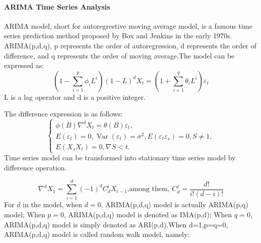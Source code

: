 \documentclass[../mcmpaper]{subfiles}
\begin{document}
    \paragraph{ARIMA Time Series Analysis}
    ARIMA model, short for autoregrestive moving average model, is a famous time series prediction method proposed by Box and Jenkins in the early 1970s\cite{7}. ARIMA(p,d,q), p represents the order of autoregression, d represents the order of difference, and q represents the order of moving average.The model can be expressed as:
    \begin{equation}
    \left(1-\sum_{i=1}^{p} \phi_{i} L^{i}\right)(1-L)^{d} X_{t}=\left(1+\sum_{i=1}^{q} \theta_{i} L^{i}\right) \varepsilon_{t}
    \end{equation}
    L is a lag operator and d is a positive integer.
    \par
    The difference expression is as follows:
    \begin{equation}
    \left\{\begin{array}{l}
    \phi(B) \nabla^{d} X_{t}=\theta(B) \varepsilon_{t}, \\
    E\left(\varepsilon_{t}\right)=0, \operatorname{Var}\left(\varepsilon_{t}\right)=\sigma^{2}, E\left(\varepsilon_{t} \varepsilon_{s}\right)=0, S \neq 1, \\
    E\left(X_{s} X_{t}\right)=0, \nabla S<t .
    \end{array}\right.
    \end{equation}
    Time series model can be transformed into stationary time series model by difference operation.
    \par
    \begin{equation}
    \nabla^{d}X_1=\sum_{i=1}^{d}(-1)^{d} C_{d}^{i} X_{t-1} \text {,among them, } C_{d}^{j}=\frac{d !}{i !(d-i) !}
    \end{equation}
    For $d$ in the model, when $d=0$, ARIMA(p,d,q) model is actually ARIMA(p,q) model; When $p=0$, ARIMA(p,d,q) model is denoted as IMA(p,d); When $q=0$, ARIMA(p,d,q) model is simply denoted as ARI(p,d).When d=1,p=q=0, ARIMA(p,d,q) model is called random walk model, namely:
\end{document}
